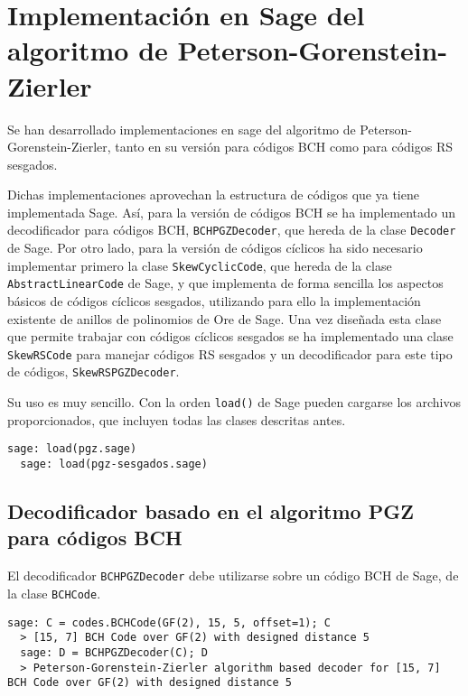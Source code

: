 \chapter[Implementación en Sage del algoritmo PGZ]{Implementación en Sage del algoritmo de Peterson-Gorenstein-Zierler}
\label{annex:pgz-sage}

Se han desarrollado implementaciones en sage del algoritmo de Peterson-Gorenstein-Zierler, tanto en su versión para códigos BCH como para códigos RS sesgados.

Dichas implementaciones aprovechan la estructura de códigos que ya tiene implementada Sage.
Así, para la versión de códigos BCH se ha implementado un decodificador para códigos BCH, \texttt{BCHPGZDecoder}, que hereda de la clase \texttt{Decoder} de Sage.
Por otro lado, para la versión de códigos cíclicos ha sido necesario implementar primero la clase \texttt{SkewCyclicCode}, que hereda de la clase \texttt{AbstractLinearCode} de Sage, y que implementa de forma sencilla los aspectos básicos de códigos cíclicos sesgados, utilizando para ello la implementación existente de anillos de polinomios de Ore de Sage.
Una vez diseñada esta clase que permite trabajar con códigos cíclicos sesgados se ha implementado una clase \texttt{SkewRSCode} para manejar códigos RS sesgados y un decodificador para este tipo de códigos, \texttt{SkewRSPGZDecoder}.

Su uso es muy sencillo.
Con la orden \texttt{load()} de Sage pueden cargarse los archivos proporcionados, que incluyen todas las clases descritas antes.

\begin{lstlisting}[gobble=2]
  sage: load(pgz.sage)
  sage: load(pgz-sesgados.sage)
\end{lstlisting}

\section{Decodificador basado en el algoritmo PGZ para códigos BCH}

El decodificador \texttt{BCHPGZDecoder} debe utilizarse sobre un código BCH de Sage, de la clase \texttt{BCHCode}.

\begin{lstlisting}[gobble=2]
  sage: C = codes.BCHCode(GF(2), 15, 5, offset=1); C
  > [15, 7] BCH Code over GF(2) with designed distance 5
  sage: D = BCHPGZDecoder(C); D
  > Peterson-Gorenstein-Zierler algorithm based decoder for [15, 7] BCH Code over GF(2) with designed distance 5
\end{lstlisting}


